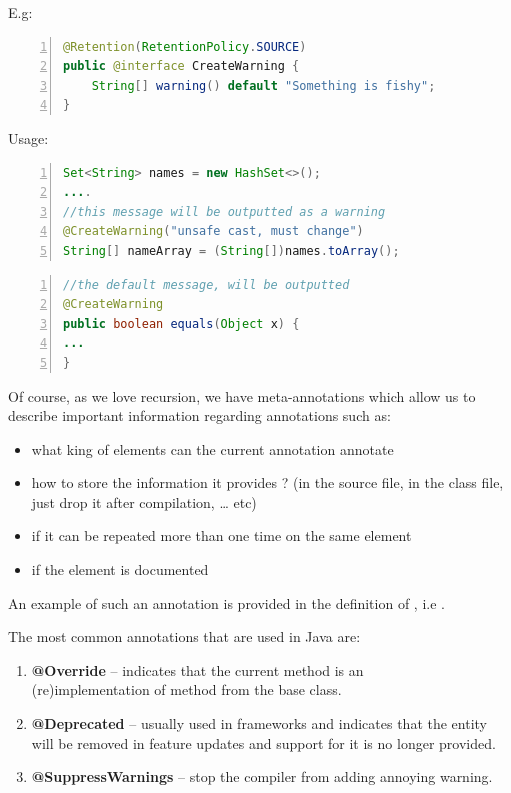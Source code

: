 	E.g:
	\small
	\begin{lstlisting}[language=Java,numbers=left]
@Retention(RetentionPolicy.SOURCE)
public @interface CreateWarning {
	String[] warning() default "Something is fishy"; 
}
	\end{lstlisting}
	\normalsize{}
	
	Usage:
	
	
	\small
	\begin{lstlisting}[language=Java,numbers=left]
Set<String> names = new HashSet<>();
....
//this message will be outputted as a warning
@CreateWarning("unsafe cast, must change")
String[] nameArray = (String[])names.toArray();
	\end{lstlisting}
	\normalsize{}
	
	\small
	\begin{lstlisting}[language=Java,numbers=left]
//the default message, will be outputted
@CreateWarning
public boolean equals(Object x) {
...
}
	\end{lstlisting}
	\normalsize{}
	
	Of course, as we love recursion, we have meta-annotations which
allow us to describe important information regarding annotations such as:
	\begin{itemize}
	 	\item what king of elements can the current annotation annotate
	 	\item how to store the information it provides ? (in the source file, in the
class file, just drop it after compilation, \ldots{} etc)
	 	\item if it can be repeated more than one time on the same element
	 	\item if the element is  documented
	\end{itemize}
	An example of such an annotation is provided in the definition of
, i.e .
	
	The most common annotations that are used in {J}ava are:
	\begin{enumerate}
	  \item \textbf{@Override} -- indicates that the current method is an \\
 (re)implementation of method from the base class.
  
	  \item \textbf{@Deprecated} -- usually used in frameworks and indicates that
	  the entity will be removed in feature updates and support for it is no longer
 provided.
 
	  \item \textbf{@SuppressWarnings} -- stop the compiler from adding annoying
 warning.
	\end{enumerate}	

